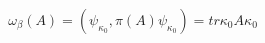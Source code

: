 \begin{equation}
\omega_{\beta}(A)=\left(  \psi_{\kappa_{0}},\pi(A)\psi_{\kappa_{0}}\right)
=tr\kappa_{0}A\kappa_{0}%
\end{equation}


